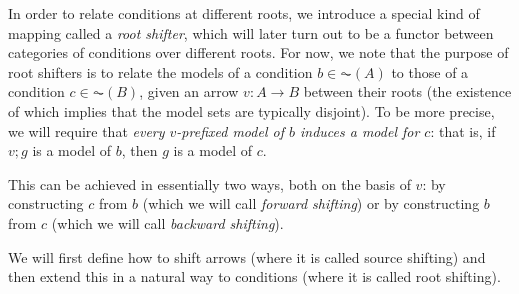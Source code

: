 In order to relate conditions at different roots, we introduce a special kind of mapping called a \emph{root shifter}, which will later turn out to be a functor between categories of conditions over different roots. For now, we note that the purpose of root shifters is to relate the models of a condition $b\in \AC(A)$ to those of a condition $c\in \AC(B)$, given an arrow $v:A\to B$ between their roots (the existence of which implies that the model sets are typically disjoint). To be more precise, we will require that \emph{every $v$-prefixed model of $b$ induces a model for $c$}: that is, if $v;g$ is a model of $b$, then $g$ is a model of $c$.

This can be achieved in essentially two ways, both on the basis of $v$: by constructing $c$ from $b$ (which we will call \emph{forward shifting}) or by constructing $b$ from $c$ (which we will call \emph{backward shifting}).

We will first define how to shift arrows (where it is called source shifting) and then extend this in a natural way to conditions (where it is called root shifting).

